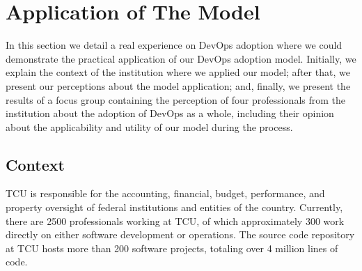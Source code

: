 \section{Application of The Model} \label{sec:TCU}

{
\color{blue}
In this section we detail a real experience on DevOps adoption where we could
demonstrate the practical application of our DevOps adoption model. Initially,
we explain the context of the institution where we applied our model; after that, 
we present our perceptions about the model application; and,
finally, we present the results of a focus group containing the perception of
four professionals from the institution about the adoption of DevOps as a whole,
including their opinion about the applicability and utility of our model
during the process.
}

\subsection{Context}

TCU is responsible for the accounting, financial, budget, performance, and property
oversight of federal institutions and entities of the country. Currently, there are 2500
professionals working at TCU, of which approximately 300 work directly on either
software development or operations. The source code repository at TCU hosts
more than 200 software projects, totaling over 4 million lines of code.

